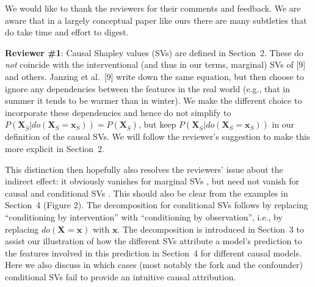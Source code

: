 \documentclass{article}
\newcommand{\vX}{\mathbf{X}}
\newcommand{\vx}{\mathbf{x}}
\newcommand{\expectation}{\mathbb{E}}
\newcommand{\contribution}{{\phi}}
\newcommand{\dodo}{\mathit{do}}
\newcommand{\lvdo}[1]{\dodo(\vX_{#1} = \vx_{#1})}
\newcommand{\perm}{\pi}
\newcommand{\isequal}{\hspace*{-2.5mm} & = & \hspace*{-2.5mm}}
\newcommand{\Spre}{\underline{S}}
\newcommand{\Spost}{\bar{S}}
\begin{document}
We would like to thank the reviewers for their comments and feedback. We are aware that in a largely conceptual paper like ours there are many subtleties that do take time and effort to digest. 

{\bf Reviewer \#1}: Causal Shapley values (SVs) are defined in Section~2.
These do {\em not} coincide with the interventional (and thus in our terms, marginal) SVs of [9] and others. Janzing et al.~[9] write down the same equation, but then choose to ignore any dependencies between the features in the real world (e.g., that in summer it tends to be warmer than in winter).
We make the different choice to incorporate these dependencies and hence do not simplify to $P(\vX_{\bar{S}}|\lvdo{S}) = P(\vX_{\bar{S}})$, but keep $P(\vX_{\bar{S}}|\lvdo{S})$ in our definition of the causal SVs. We will follow the reviewer's suggestion to make this more explicit in Section~2.

This distinction then hopefully also resolves the reviewers' issue about the indirect effect: it obviously vanishes for marginal SVs%
, but need not vanish for causal and conditional SVs%
. This should also be clear from the examples in Section~4 (Figure 2). The decomposition for conditional SVs follows by replacing ``conditioning by intervention'' with ``conditioning by observation'', i.e., by replacing $\lvdo{}$ with $\vx$.
The decomposition is introduced in Section~3 to assist our illustration of how the different SVs attribute a model's prediction to the features involved in this prediction in Section~4 for different causal models. Here we also discuss in which cases (most notably the fork and the confounder) conditional SVs fail to provide an intuitive causal attribution.
\end{document}
